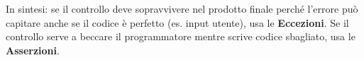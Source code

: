 \begin{tip}
In sintesi: se il controllo deve sopravvivere nel prodotto finale perché l'errore può capitare anche se il codice è perfetto (es. input utente), usa le \textbf{Eccezioni}. Se il controllo serve a beccare il programmatore mentre scrive codice sbagliato, usa le \textbf{Asserzioni}.
\end{tip}

























